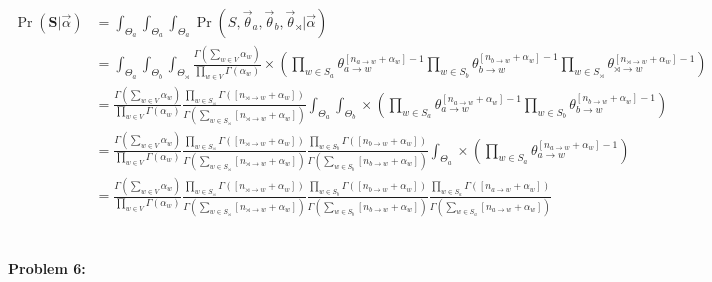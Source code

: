 \documentclass[10pt]{article}
\begin{document}
\begin{equation*}
\begin{aligned} 
\Pr(\mathbf{S}|\vec{\alpha}) 
&= \int_{\Theta_a}\int_{\Theta_a}\int_{\Theta_a}\Pr(S, \vec{\theta}_{a}, \vec{\theta}_{b}, \vec{\theta}_{\rtimes} |
\vec{\alpha})
\\
&=\int_{\Theta_a}\int_{\Theta_b}\int_{\Theta_\rtimes}
{\frac {\Gamma
\left(\sum_{w \in V}\alpha _{w}\right)}{\prod _{w \in V} \Gamma (\alpha _{w})}} \times 
(\prod_{w\in S_a}
{\theta}_{a \rightarrow w}^{[n_{a \rightarrow w}+\alpha_w]-1} \prod_{w\in S_b}
{\theta}_{b \rightarrow w}^{[n_{b \rightarrow w}+\alpha_w]-1}
\prod_{w\in S_\rtimes}
{\theta}_{\rtimes \rightarrow w}^{[n_{\rtimes \rightarrow w}+\alpha_w]-1})
\\
&= {\frac {\Gamma
\left(\sum_{w \in V}\alpha _{w}\right)}{\prod _{w \in V} \Gamma (\alpha _{w})}}
{\frac{\prod _{w \in S_\rtimes} \Gamma
([n_{\rtimes \rightarrow w}+\alpha_{w}])}{\Gamma \left(\sum_{w\in S_\rtimes}[n_{\rtimes \rightarrow w}+\alpha_{w}]\right)}}
\int_{\Theta_a}\int_{\Theta_b}
\times 
(\prod_{w\in S_a}
{\theta}_{a \rightarrow w}^{[n_{a \rightarrow w}+\alpha_w]-1} \prod_{w\in S_b}
{\theta}_{b \rightarrow w}^{[n_{b \rightarrow w}+\alpha_w]-1})
\\
&= {\frac {\Gamma
\left(\sum_{w \in V}\alpha _{w}\right)}{\prod _{w \in V} \Gamma (\alpha _{w})}}
{\frac{\prod _{w \in S_\rtimes} \Gamma
([n_{\rtimes \rightarrow w}+\alpha_{w}])}{\Gamma \left(\sum_{w\in S_\rtimes}[n_{\rtimes \rightarrow w}+\alpha_{w}]\right)}}
{\frac{\prod _{w \in S_b} \Gamma
([n_{b \rightarrow w}+\alpha_{w}])}{\Gamma \left(\sum_{w\in S_b}[n_{b \rightarrow w}+\alpha_{w}]\right)}}
\int_{\Theta_a}
\times 
(\prod_{w\in S_a}
{\theta}_{a \rightarrow w}^{[n_{a \rightarrow w}+\alpha_w]-1})
\\
&= {\frac {\Gamma
\left(\sum_{w \in V}\alpha _{w}\right)}{\prod _{w \in V} \Gamma (\alpha _{w})}}
{\frac{\prod _{w \in S_\rtimes} \Gamma
([n_{\rtimes \rightarrow w}+\alpha_{w}])}{\Gamma \left(\sum_{w\in S_\rtimes}[n_{\rtimes \rightarrow w}+\alpha_{w}]\right)}}
{\frac{\prod _{w \in S_b} \Gamma
([n_{b \rightarrow w}+\alpha_{w}])}{\Gamma \left(\sum_{w\in S_b}[n_{b \rightarrow w}+\alpha_{w}]\right)}}
{\frac{\prod _{w \in S_a} \Gamma
([n_{a \rightarrow w}+\alpha_{w}])}{\Gamma \left(\sum_{w\in S_a}[n_{a \rightarrow w}+\alpha_{w}]\right)}}
\end{aligned}
\end{equation*}
\\

\hrulefill
\paragraph{Problem 6:}
\end{document}
